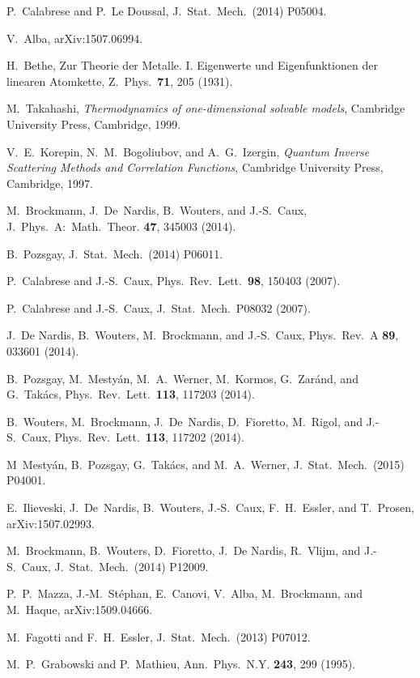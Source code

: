 \documentclass[11pt]{iopart}
\begin{document}
\begin{thebibliography}{99}

P.~Calabrese and P.~Le Doussal, J.\ Stat.\ Mech.\ (2014) P05004. 

V.~Alba, arXiv:1507.06994.

H.~Bethe, Zur Theorie der Metalle. I. Eigenwerte und Eigenfunktionen 
der linearen Atomkette, Z.\ Phys.\ {\bf 71}, 205 (1931).

M.~Takahashi, {\it Thermodynamics of one-dimensional solvable models}, 
Cambridge University Press, Cambridge, 1999.

V.~E.~Korepin, N.~M.~Bogoliubov, and A.~G.~Izergin, \emph{Quantum
Inverse Scattering Methods and Correlation Functions}, Cambridge
University Press, Cambridge, 1997.

M.~Brockmann, J.~De~Nardis, B.~Wouters, and J.-S.~Caux, J.\ Phys.\ A:\ 
Math.\ Theor. {\bf 47}, 345003 (2014). 

B.~Pozsgay, J.\ Stat.\ Mech.\ (2014) P06011. 

P.~Calabrese and J.-S.~Caux, Phys.\ Rev.\ Lett.\ {\bf 98}, 150403 (2007).

P.~Calabrese and J.-S.~Caux, J.\ Stat.\ Mech.\ P08032 (2007).

J.~De Nardis, B.~Wouters, M.~Brockmann, and J.-S.~Caux, Phys.\ Rev.\ A {\bf 89}, 
033601 (2014). 

B.~Pozsgay, M.~Mesty\'an, M.~A.~Werner, M.~Kormos, G.~Zar\'and, and G.~Tak\'acs,
Phys.\ Rev.\ Lett.\ {\bf 113}, 117203 (2014). 

B.~Wouters, M.~Brockmann, J.~De~Nardis, D.~Fioretto, M.~Rigol, and J.-S.~Caux, 
Phys.\ Rev.\ Lett.\ {\bf 113}, 117202 (2014). 

M~Mesty\'an, B.~Pozsgay, G.~Tak\'acs, and M.~A.~Werner, J.\ Stat.\ Mech.\ (2015) 
P04001.

E.~Ilieveski, J.~De~Nardis, B.~Wouters, J.-S.~Caux, F.~H.~Essler, and T.~Prosen, 
arXiv:1507.02993. 

M.~Brockmann, B.~Wouters, D.~Fioretto, J.~De Nardis, R.~Vlijm, and J.-S.~Caux, 
J.\ Stat.\ Mech.\ (2014) P12009. 

P.~P.~Mazza, J.-M.~St\'ephan, E.~Canovi, V.~Alba, M.~Brockmann, and M.~Haque, 
arXiv:1509.04666.

M.~Fagotti and F.~H.~Essler, J.\ Stat.\ Mech.\ (2013) P07012. 

M.~P.~Grabowski and P.~Mathieu, Ann.\ Phys.\ N.Y. {\bf 243},
299 (1995).


\end{thebibliography}
\end{document}
